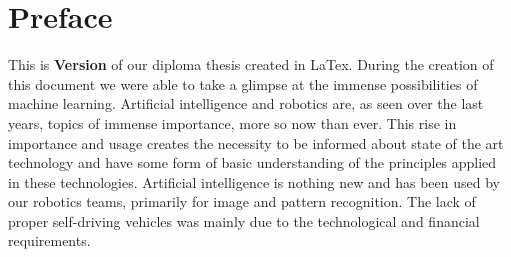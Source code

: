 \chapter{Preface}


This is \textbf{Version \htldiplDate} of our diploma thesis created in LaTex.
During the creation of this document we were able to take a glimpse at the immense possibilities of machine learning. Artificial intelligence and robotics are, as seen over the last years, topics of immense importance, more so now than ever. This rise in importance and usage creates the necessity to be informed about state of the art technology and have some form of basic understanding of the principles applied in these technologies. Artificial intelligence is nothing new and has been used by our robotics teams, primarily for image and pattern recognition. The lack of proper self-driving vehicles was mainly due to the technological and financial requirements. 
